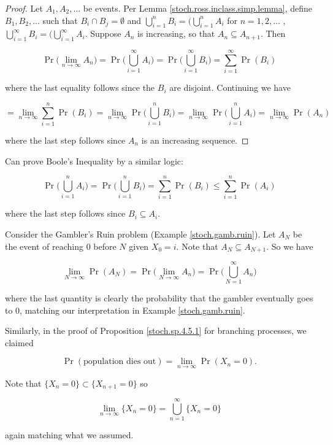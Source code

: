 \begin{proof}Let \(A_1, A_2, \ldots\) be events. Per Lemma \ref{stoch.ross.inclass.simp.lemma}, define \(B_1, B_2, \ldots\) such that \(B_i \cap B_j = \emptyset\) and \(\bigcup_{i=1}^n B_i = (\bigcup_{i=1}^n A_i\) for \(n = 1, 2, \ldots\) , \(\bigcup_{i=1}^\infty B_i = (\bigcup_{i=1}^\infty A_i \). Suppose \(A_n\) is increasing, so that \(A_n \subseteq A_{n+1}\). Then

\[ 
\Pr \Big(\lim_{n \to \infty}A_n \Big) = \Pr \bigg( \bigcup_{i=1}^\infty A_i \bigg) = \Pr \bigg( \bigcup_{i=1}^\infty B_i \bigg) = \sum_{i=1}^\infty \Pr(B_i) 
\]

where the last equality follows since the \(B_i\) are disjoint. Continuing we have

\[
= \lim_{n \to \infty} \sum_{i=1}^n \Pr(B_i) = \lim_{n \to \infty} \Pr \bigg( \bigcup_{i=1}^n B_i \bigg)  = \lim_{n \to \infty} \Pr \bigg( \bigcup_{i=1}^n A_i \bigg)  = \lim_{n \to \infty} \Pr (A_n)
\]

where the last step follows since \(A_n\) is an increasing sequence.

\end{proof}

\begin{remark}Can prove Boole's Inequality by a similar logic:

\[
\Pr \bigg( \bigcup_{i=1}^n A_i \bigg) = \Pr \bigg( \bigcup_{i=1}^n B_i \bigg) = \sum_{i=1}^n \Pr(B_i) \leq \sum_{i=1}^n \Pr(A_i)
\]

where the last step follows since \(B_i \subseteq A_i\). 

\end{remark}

\begin{remark}
Consider the Gambler's Ruin problem (Example \ref{stoch.gamb.ruin}). Let \(A_N \) be the event of reaching 0 before \(N\) given \(X_0 =i\). Note that \(A_N \subseteq A_{N+1}\). So we have

\[
\lim_{N \to \infty} \Pr(A_N) = \Pr \bigg( \lim_{N \to \infty} A_n \bigg) =  \Pr \bigg( \bigcup_{N =1}^ { \infty} A_n \bigg) 
\]

where the last quantity is clearly the probability that the gambler eventually goes to 0, matching our interpretation in Example \ref{stoch.gamb.ruin}.

Similarly, in the proof of Proposition \ref{stoch.sp.4.5.1} for branching processes, we claimed 

\[
\Pr(\text{population dies out}) = \lim_{n \to \infty} \Pr(X_n = 0) .
\]

Note that \(\{X_n = 0\} \subset \{X_{n+1} = 0\}\) so

\[
\lim_{n \to \infty} \{ X_n =0\} = \bigcup_{n=1}^\infty \{X_n = 0\}
\]

again matching what we assumed.
\end{remark}

